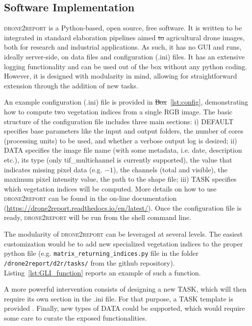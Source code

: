 \documentclass[drones,technicalnote,accept,pdftex,moreauthors]{Definitions/mdpi}
\providecommand{\DIFadd}[1]{{\protect\color{blue}\uwave{#1}}} %
\providecommand{\DIFdel}[1]{{\protect\color{red}\sout{#1}}}                      %
\providecommand{\DIFaddbegin}{} %
\providecommand{\DIFaddend}{} %
\providecommand{\DIFdelbegin}{} %
\providecommand{\DIFdelend}{} %
\newcommand{\DIFscaledelfig}{0.5}
\newlength{\DIFdelgraphicswidth} %
\newlength{\DIFdelgraphicsheight} %
\newcommand{\DIFaddincludegraphics}[2][]{{\color{blue}\fbox{\DIFOincludegraphics[#1]{#2}}}} %
\newcommand{\DIFdelincludegraphics}[2][]{%
\sbox{\DIFdelgraphicsbox}{\DIFOincludegraphics[#1]{#2}}%
\settoboxwidth{\DIFdelgraphicswidth}{\DIFdelgraphicsbox} %
\settoboxtotalheight{\DIFdelgraphicsheight}{\DIFdelgraphicsbox} %
\scalebox{\DIFscaledelfig}{%
\parbox[b]{\DIFdelgraphicswidth}{\usebox{\DIFdelgraphicsbox}\\[-\baselineskip] \rule{\DIFdelgraphicswidth}{0em}}\llap{\resizebox{\DIFdelgraphicswidth}{\DIFdelgraphicsheight}{%
\setlength{\unitlength}{\DIFdelgraphicswidth}%
\begin{picture}(1,1)%
\thicklines\linethickness{2pt} %
{\color[rgb]{1,0,0}\put(0,0){\framebox(1,1){}}}%
{\color[rgb]{1,0,0}\put(0,0){\line( 1,1){1}}}%
{\color[rgb]{1,0,0}\put(0,1){\line(1,-1){1}}}%
\end{picture}%
}\hspace*{3pt}}} %
} %
\DeclareRobustCommand{\DIFaddbegin}{\DIFOaddbegin \let\includegraphics\DIFaddincludegraphics} %
\DeclareRobustCommand{\DIFaddend}{\DIFOaddend \let\includegraphics\DIFOincludegraphics} %
\DeclareRobustCommand{\DIFdelbegin}{\DIFOdelbegin \let\includegraphics\DIFdelincludegraphics} %
\DeclareRobustCommand{\DIFdelend}{\DIFOaddend \let\includegraphics\DIFOincludegraphics} %
\begin{document}
\subsection{Software Implementation}

\textsc{drone2report} is a Python-based, open source, free software. It is written to be integrated in standard elaboration pipelines aimed \DIFdelbegin \DIFdel{to }\DIFdelend \DIFaddbegin \DIFadd{for }\DIFaddend agricultural drone images, both for research and industrial applications. As such, it has no GUI and runs, ideally server-side, on data files and configuration (.ini) files. It has an extensive logging functionality and can be used out of the box without any python coding. However, it is designed with modularity in mind, allowing for straightforward extension through the addition of new tasks.

An example configuration (.ini) file is provided in \DIFdelbegin \DIFdel{Box}\DIFdelend \DIFaddbegin \DIFadd{Listing}\DIFaddend ~\ref{lst:config}, demonstrating how to compute two vegetation indices from a single RGB image.
The basic structure of the configuration file includes three main sections: i) DEFAULT specifies base parameters like the input and output folders, the number of cores (processing units) to be used, and whether a verbose output log is desired; ii) DATA specifies the image file name (with some metadata, i.e. date, description etc.), its type (only tif\_multichannel is currently supported), the value that indicates missing pixel data (e.g. $-1$), the channels (total and visible), the maximum pixel intensity value, the path to the shape file; iii) TASK specifies which vegetation indices will be computed. 
More details on how to use \textsc{drone2report} can be found in the on-line documentation (\url{https://drone2report.readthedocs.io/en/latest/}).
Once the configuration file is ready, \textsc{drone2report} will be run from the shell command line.

The modularity of \textsc{drone2report} can be leveraged at several levels. The easiest customization would be to add new specialized vegetation indices to the proper python file (e.g. \verb|matrix_returning_indices.py| file in the folder \verb|/drone2report/d2r/tasks/| from the github repository). Listing~\ref{lst:GLI_function} reports an example of such a function.

A more powerful intervention consists of designing a new TASK, which will then require its own section in the .ini file. For that purpose, a TASK template is provided \DIFaddbegin \DIFadd{in the documentation of the tool}\DIFaddend . Finally, new types of DATA could be supported, which would require some care to curate the exposed functionalities.
\end{document}
